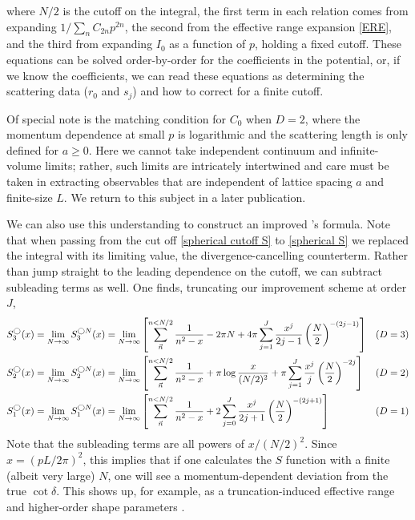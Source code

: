 where $N/2$ is the cutoff on the integral, the first term in each relation comes from expanding $1/\sum_n C_{2n} p^{2n}$, the second from the effective range expansion \eqref{ERE}, and the third from expanding $I_0$ as a function of $p$, holding a fixed cutoff.  These equations can be solved order-by-order for the coefficients in the potential, or, if we know the coefficients, we can read these equations as determining the scattering data ($r_0$ and $s_j$) and how to correct for a finite cutoff.

Of special note is the matching condition for $C_0$ when $D=2$, where the momentum dependence at small $p$ is logarithmic and the scattering length is only defined for $a\ge 0$\cite{???}.  Here we cannot take independent continuum and infinite-volume limits; rather, such limits are intricately intertwined and care must be taken in extracting observables that are independent of lattice spacing $a$ and finite-size $L$.  We return to this subject in a later publication\cite{???}.

We can also use this understanding to construct an improved \Luscher's formula.
Note that when passing from the cut off \eqref{spherical cutoff S} to \eqref{spherical S} we replaced the integral with its limiting value, the divergence-cancelling counterterm.
Rather than jump straight to the leading dependence on the cutoff, we can subtract subleading terms as well.
One finds, truncating our improvement scheme at order $J$,
\begin{align}
    S_3^\bigcirc(x)  = \lim_{N\rightarrow\infty} S^{\bigcirc N}_3(x)
    &=
    \lim_{N\rightarrow\infty}\left[\sum_{\vec{n}}^{n<N/2} \frac{1}{n^2-x}-2\pi N
        + 4\pi \sum_{j=1}^{J} \frac{x^j}{2j-1} \left(\frac{N}{2}\right)^{-(2j-1)}
    \right]
    &
    (D&=3)
    \nonumber\\
    S_2^\bigcirc(x)  = \lim_{N\rightarrow\infty} S^{\bigcirc N}_2(x)
    &=
    \lim_{N\rightarrow\infty}\left[\sum_{\vec{n}}^{n<N/2} \frac{1}{n^2-x}
        + \pi \log \frac{x}{(N/2)^2}
        + \pi \sum_{j=1}^{J} \frac{x^j}{j} \left(\frac{N}{2}\right)^{-2j}
    \right]
    &
    (D&=2)
    \label{eq:improved spherical S}\\\nonumber
    S_1^\bigcirc(x)  = \lim_{N\rightarrow\infty} S^{\bigcirc N}_1(x)
    &=
    \lim_{N\rightarrow\infty}\left[\sum_{\vec{n}}^{n<N/2} \frac{1}{n^2-x}
        + 2 \sum_{j=0}^{J} \frac{x^j}{2j+1}\left(\frac{N}{2}\right)^{-(2j+1)}
        \right]
    &
    (D&=1)
\end{align}
Note that the subleading terms are all powers of $x/(N/2)^2$.
Since $x=(pL/2\pi)^2$, this implies that if one calculates the $S$ function with a finite (albeit very large) $N$, one will see a momentum-dependent deviation from the true $\cot\delta$.
This shows up, for example, as a truncation-induced effective range and higher-order shape parameters .

